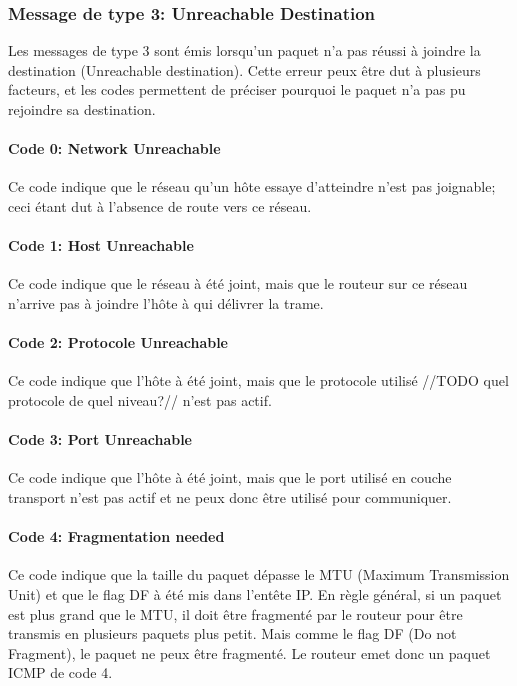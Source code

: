 \subsubsection{Message de type 3: Unreachable Destination}
Les messages de type 3 sont émis lorsqu'un paquet n'a pas réussi à joindre la
destination (Unreachable destination). Cette erreur peux être dut à plusieurs
facteurs, et les codes permettent de préciser pourquoi le paquet n'a pas pu
rejoindre sa destination.

\paragraph{Code 0: Network Unreachable} Ce code indique que le réseau qu'un hôte essaye
d'atteindre n'est pas joignable; ceci étant dut à l'absence de route vers ce réseau.

\paragraph{Code 1: Host Unreachable} Ce code indique que le réseau à été joint, mais que
le routeur sur ce réseau n'arrive pas à joindre l'hôte à qui délivrer la trame.

\paragraph{Code 2: Protocole Unreachable} Ce code indique que l'hôte à été joint, mais
que le protocole utilisé //TODO quel protocole de quel niveau?// n'est pas actif.

\paragraph{Code 3: Port Unreachable} Ce code indique que l'hôte à été joint, mais que le
port utilisé en couche transport n'est pas actif et ne peux donc être utilisé pour
communiquer.

\paragraph{Code 4: Fragmentation needed} Ce code indique que la taille du paquet dépasse
le MTU (Maximum Transmission Unit) et que le flag DF à été mis dans l'entête IP.
En règle général, si un paquet est plus grand que le MTU, il doit être fragmenté par le
routeur pour être transmis en plusieurs paquets plus petit. Mais comme le flag DF (Do not
Fragment), le paquet ne peux être fragmenté. Le routeur emet donc un paquet ICMP de code 4.

